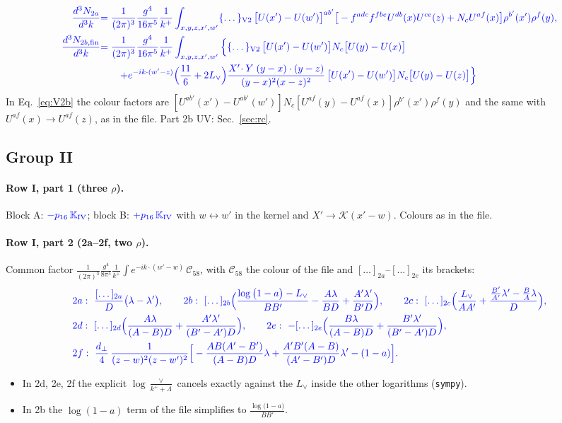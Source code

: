 \documentclass[10pt]{article}
\numberwithin{equation}{section}
\newcommand{\new}[1]{{\color{blue}#1}}
\newcommand{\Lv}{L_{\vee}}
\newcommand{\KK}{\mathcal K}
\newcommand{\pre}{\frac{1}{(2\pi)^3}}
\newcommand{\phw}{e^{-ik\cdot(w'-w)}}
\newcommand{\la}{\log\big(1-a\big)}
\begin{document}
\begin{align}
\new{\frac{d^3N_{2a}}{d^3k}}&\new{=\pre\frac{g^4}{16\pi^5}\frac{1}{k^+}\int_{x,y,z,x',w'}\{\dots\}_{\rm V2}\,\big[U(x')-U(w')\big]^{ab'}\big[-f^{adc}f^{fbe}U^{db}(x)U^{ce}(z)+N_cU^{af}(x)\big]\rho^{b'}(x')\rho^f(y),}\label{eq:V2a}\\
\new{\frac{d^3N_{2b,\rm fin}}{d^3k}}&\new{=\pre\frac{g^4}{16\pi^5}\frac{1}{k^+}\int_{x,y,z,x',w'}\Big\{\{\dots\}_{\rm V2}\,\big[U(x')-U(w')\big]N_c\big[U(y)-U(x)\big]}\notag\\
&\new{\qquad+e^{-ik\cdot(w'-z)}\Big(\frac{11}{6}+2\Lv\Big)\frac{X'\!\cdot Y\;(y-x)\cdot(y-z)}{(y-x)^2(x-z)^2}\,\big[U(x')-U(w')\big]N_c\big[U(y)-U(z)\big]\Big\}}\label{eq:V2b}
\end{align}
In Eq.~\eqref{eq:V2b} the colour factors are $[U^{ab'}(x')-U^{ab'}(w')]N_c[U^{af}(y)-U^{af}(x)]\rho^{b'}(x')\rho^f(y)$ and the same with $U^{af}(x)\to U^{af}(z)$, as in the file. Part 2b UV: Sec.~\ref{sec:rc}.

\subsection{Group II}
\paragraph{Row I, part 1 (three $\rho$).} Block A: $\new{-p_{16}\,\mathbb K_{\rm IV}}$; block B: $\new{+p_{16}\,\mathbb K_{\rm IV}}$ with $w\leftrightarrow w'$ in the kernel and $X'\to\KK(x'-w)$. Colours as in the file.
\paragraph{Row I, part 2 (2a--2f, two $\rho$).} Common factor $\pre\frac{g^4}{8\pi^5}\frac{1}{k^+}\int\phw\,\mathcal C_{58}$, with $\mathcal C_{58}$ the colour of the file and $[\dots]_{2a}$--$[\dots]_{2e}$ its brackets:
\begin{align*}
&\new{2a:\ \frac{[\dots]_{2a}}{D}\big(\lambda-\lambda'\big),\qquad 2b:\ [\dots]_{2b}\Big(\frac{\la-\Lv}{BB'}-\frac{A\lambda}{BD}+\frac{A'\lambda'}{B'D}\Big),\qquad 2c:\ [\dots]_{2c}\Big(\frac{\Lv}{AA'}+\frac{\frac{B'}{A'}\lambda'-\frac BA\lambda}{D}\Big),}\\
&\new{2d:\ [\dots]_{2d}\Big(\frac{A\lambda}{(A-B)D}+\frac{A'\lambda'}{(B'-A')D}\Big),\qquad 2e:\ -[\dots]_{2e}\Big(\frac{B\lambda}{(A-B)D}+\frac{B'\lambda'}{(B'-A')D}\Big),}\\
&\new{2f:\ \frac{d_\perp}{4}\,\frac{1}{(z-w)^2(z-w')^2}\Big[-\frac{AB(A'-B')}{(A-B)D}\lambda+\frac{A'B'(A-B)}{(A'-B')D}\lambda'-(1-a)\Big].}
\end{align*}
\begin{itemize}
\item In 2d, 2e, 2f the explicit $\log\frac{\vee}{k^++\Lambda}$ cancels exactly against the $\Lv$ inside the other logarithms (\texttt{sympy}).
\item In 2b the $\log(1-a)$ term of the file simplifies to $\frac{\la}{BB'}$.
\end{itemize}
\end{document}
